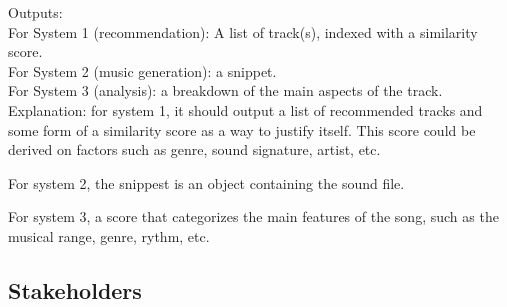 \documentclass{article}
\begin{document}
Outputs: \\
For System 1 (recommendation): A list of track(s), indexed with a similarity score. \\
For System 2 (music generation): a snippet. \\
For System 3 (analysis): a breakdown of the main aspects of the track.\\

Explanation: for system 1, it should output a list of recommended tracks and some form of a similarity score
as a way to justify itself. This score could be derived on factors such as genre, sound signature, artist, etc.

For system 2, the snippest is an object containing the sound file. 

For system 3, a score that categorizes the main features of the song, such as the musical range, genre, rythm, etc. \\

\subsection{Stakeholders}
\end{document}
